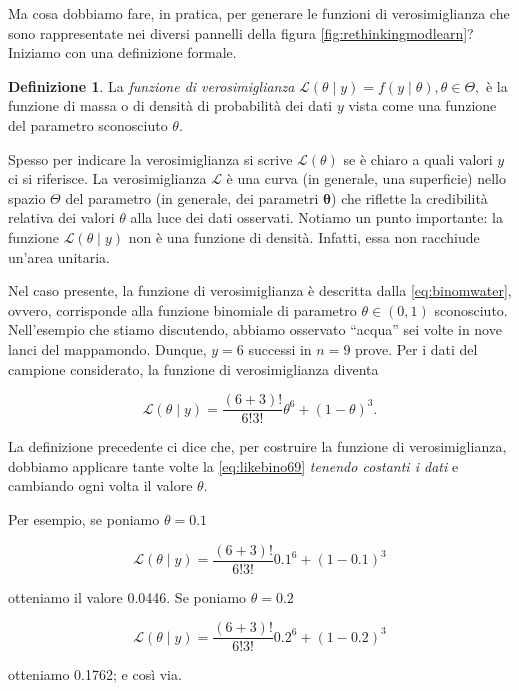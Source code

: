 \documentclass[
]{memoir}
\theoremstyle{definition}
\newtheorem{definition}{Definizione}[chapter]
\theoremstyle{definition}
\theoremstyle{definition}
\theoremstyle{definition}
\theoremstyle{remark}
\begin{document}
Ma cosa dobbiamo fare, in pratica, per generare le funzioni di verosimiglianza che sono rappresentate nei diversi pannelli della figura \ref{fig:rethinkingmodlearn}? Iniziamo con una definizione formale.

\begin{definition}
La \emph{funzione di verosimiglianza} \(\mathcal{L}(\theta \mid y) = f(y \mid \theta), \theta \in \Theta,\) è la funzione di massa o di densità di probabilità dei dati \(y\) vista come una funzione del parametro sconosciuto \(\theta\).
\end{definition}

Spesso per indicare la verosimiglianza si scrive \(\mathcal{L}(\theta)\) se è chiaro a quali valori \(y\) ci si riferisce. La verosimiglianza \(\mathcal{L}\) è una curva (in generale, una superficie) nello spazio \(\Theta\) del parametro (in generale, dei parametri \(\boldsymbol\theta\)) che riflette la credibilità relativa dei valori \(\theta\) alla luce dei dati osservati. Notiamo un punto importante: la funzione \(\mathcal{L}(\theta \mid y)\) non è una funzione di densità. Infatti, essa non racchiude un'area unitaria.

Nel caso presente, la funzione di verosimiglianza è descritta dalla \eqref{eq:binomwater}, ovvero, corrisponde alla funzione binomiale di parametro \(\theta \in (0, 1)\) sconosciuto. Nell'esempio che stiamo discutendo, abbiamo osservato ``acqua'' sei volte in nove lanci del mappamondo. Dunque, \(y = 6\) successi in \(n = 9\) prove. Per i dati del campione considerato, la funzione di verosimiglianza diventa

\begin{equation}
\mathcal{L}(\theta \mid y) = \frac{(6 + 3)!}{6!3!} \theta^6 + (1-\theta)^3.
\label{eq:likebino69}
\end{equation}

La definizione precedente ci dice che, per costruire la funzione di verosimiglianza, dobbiamo applicare tante volte la \eqref{eq:likebino69} \emph{tenendo costanti i dati} e cambiando ogni volta il valore \(\theta\).

Per esempio, se poniamo \(\theta = 0.1\)

\[
\mathcal{L}(\theta \mid y) = \frac{(6 + 3)!}{6!3!} 0.1^6 + (1-0.1)^3
\]

otteniamo il valore 0.0446. Se poniamo \(\theta = 0.2\)

\[
\mathcal{L}(\theta \mid y) = \frac{(6 + 3)!}{6!3!} 0.2^6 + (1-0.2)^3
\]

otteniamo 0.1762; e così via.
\end{document}
